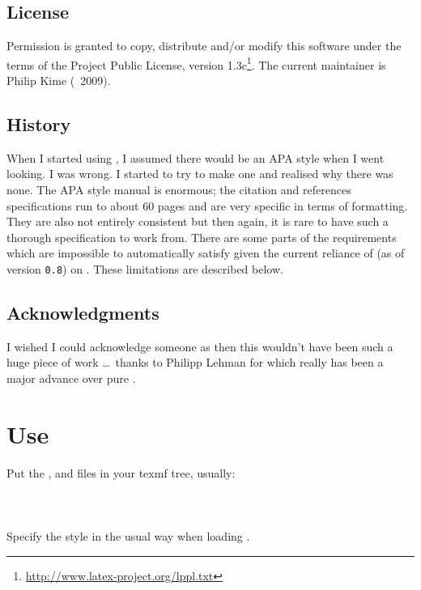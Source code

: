 \documentclass{ltxdockit}
\begin{document}
\subsection{License}

Permission is granted to copy, distribute and/or modify this software under
the terms of the \latex Project Public License, version
1.3c\footnote{\url{http://www.latex-project.org/lppl.txt}}. The current
maintainer is Philip Kime (\textcopyright\ 2009).

\subsection{History}

When I started using , I assumed there would be an APA style
when I went looking. I was wrong. I started to try to make one and realised
why there was none. The APA style manual is enormous; the citation and
references specifications run to about 60 pages and are very specific in
terms of formatting. They are also not entirely consistent but then again,
it is rare to have such a thorough specification to work from. There are
some parts of the requirements which are impossible to automatically
satisfy given the current reliance of  (as of version
\texttt{0.8}) on \bibtex . These limitations are described below.

\subsection{Acknowledgments}

I wished I could acknowledge someone as then this wouldn't have been such a
huge piece of work \ldots\ thanks to Philipp Lehman for  which
really has been a major advance over pure \bibtex.

\section{Use}\label{ref:use}
\label{use}
Put the ,  and  files in your texmf tree, usually:\\

\noindent{}\\
\\
\\

\noindent Specify the style in the usual way when loading . 
\end{document}
